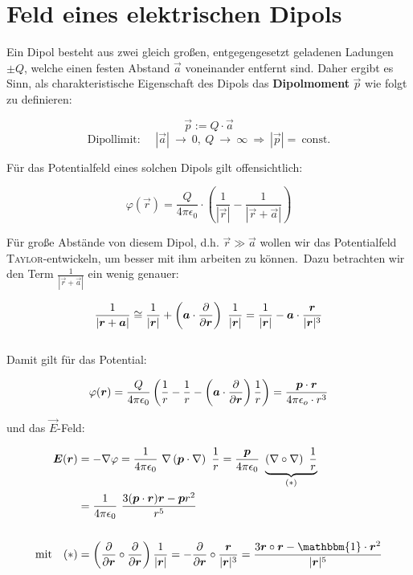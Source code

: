 \section{Feld eines elektrischen Dipols}

Ein Dipol besteht aus zwei gleich großen, entgegengesetzt geladenen Ladungen $\pm Q $, welche  einen festen Abstand $\vec{a}$ voneinander entfernt sind. Daher ergibt es Sinn, als charakteristische Eigenschaft des Dipols das \textbf{Dipolmoment} $\vec{p}$ wie folgt zu definieren:

\begin{equation*}
\vec{p} := Q \cdot \vec{a}
\end{equation*}
\begin{equation*}
\text{Dipollimit: } \quad |\vec{a}| \ \rightarrow \ 0, \ Q \ \rightarrow \ \infty \ \Rightarrow \ |\vec{p}| = \ \text{const.}
\end{equation*}

Für das Potentialfeld eines solchen Dipols gilt offensichtlich:

\begin{equation*}
\varphi(\vec{r}) = \frac{Q}{4\pi\epsilon_0}\cdot\left(\frac{1}{|\vec{r}|} - \frac{1}{|\vec{r}+\vec{a}|}\right)
\end{equation*}

Für große Abstände von diesem Dipol, d.h. $\vec{r}\gg\vec{a}$ wollen wir das Potentialfeld \textsc{Taylor}-entwickeln, um besser mit ihm arbeiten zu können.\
Dazu betrachten wir den Term $\frac{1}{|\vec{r}+\vec{a}|}$ ein wenig genauer:

\begin{equation*}
\frac{1}{|\vec{r}+\vec{a}|} \cong \frac{1}{|\vec{r}|} + \left(\vec{a}\cdot\pdiff{}{\vec{r}}\right) \ \frac{1}{|\vec{r}|} = \frac{1}{|\vec{r}|}-\vec{a}\cdot\frac{\vec{r}}{|\vec{r}|^3}
\end{equation*}
\ \\
Damit gilt für das Potential:

\begin{equation*}
\varphi(\bm{r})=\frac{Q}{4\pi\epsilon_0}\left(\frac{1}{r}-\frac{1}{r}-\left(\bm{a}\cdot\frac{\partial{}}{\partial{\bm{r}}}\right)\frac{1}{r}\right) = \frac{\bm{p}\cdot\bm{r}}{4\pi\epsilon_o\cdot r^3}
\end{equation*}

und das $\vec{E}$-Feld:

\begin{align*}
\vec{E}(\vec{r}) &= - \nabla \varphi = \frac{1}{4\pi\epsilon_0}\ \nabla \left(\vec{p}\cdot\nabla\right)\ \frac{1}{r} = \frac{\vec{p}}{4\pi\epsilon_0}\ \underbrace{\left(\nabla \circ \nabla\right)\ \frac{1}{r}}_{(*)}\\
&= \frac{1}{4\pi\epsilon_0}\ \frac{3(\vec{p}\cdot\vec{r})\vec{r} - \vec{p}r^2}{r^5}\\
\ \\
\text{mit}\quad (*) &= \left(\pdiff{}{\vec{r}} \circ \pdiff{}{\vec{r}}\right)\frac{1}{|\vec{r}|} = - \pdiff{}{\vec{r}}\circ\frac{\vec{r}}{|\vec{r}|^3} = \frac{3\vec{r}\circ\vec{r}-\mathbbm{1}\cdot\vec{r}^2}{|\vec{r}|^5}
\end{align*}